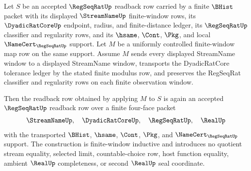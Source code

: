 \begin{theorem}
\label{thm:regseqrat-uniform-continuity-preservation}
Let $S$ be an accepted $\RegSeqRatUp$ readback row carried by a finite
$\BHist$ packet with its displayed $\StreamNameUp$ finite-window rows, its
$\DyadicRatCoreUp$ endpoint, radius, and finite-distance ledger, its
$\RegSeqRatUp$ classifier and regularity rows, and its $\hsame$, $\Cont$,
$\Pkg$, and local $\NameCert_{\RegSeqRatUp}$ support. Let $M$ be a uniformly
controlled finite-window map row on the same support. Assume $M$ sends every
displayed StreamName window to a displayed StreamName window, transports the
DyadicRatCore tolerance ledger by the stated finite modulus row, and preserves
the RegSeqRat classifier and regularity rows on each finite observation
window.

Then the readback row obtained by applying $M$ to $S$ is again an accepted
$\RegSeqRatUp$ readback row over a finite four-face packet
$$
\StreamNameUp,\quad \DyadicRatCoreUp,\quad \RegSeqRatUp,\quad \RealUp
$$
with the transported $\BHist$, $\hsame$, $\Cont$, $\Pkg$, and
$\NameCert_{\RegSeqRatUp}$ support. The construction is finite-window
inductive and introduces no quotient stream equality, selected limit,
countable-choice row, host function equality, ambient $\RealUp$ completeness,
or second $\RealUp$ seal coordinate.
\end{theorem}
